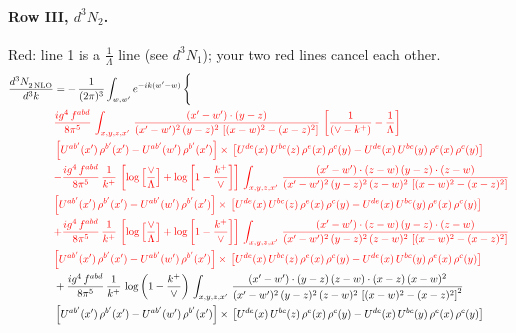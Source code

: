 \documentclass[10pt]{article}
\numberwithin{equation}{section}
\newcommand{\old}[1]{{\color{red}#1}}
\newcommand{\rc}{\color{red}}
\begin{document}
\paragraph{Row III, $d^3N_2$.}
\old{Red}: line 1 is a $\frac{1}{\Lambda}$ line (see $d^3N_1$); your two red lines cancel each other.
\begin{align}
   \frac{d^{3}N_{2\,\rm NLO}^{\rm}}{d^{3}k}  & =  -\,\frac{1}{(2\pi)^{3}}  \int_{w, w^\prime} e^{-ik(w^\prime-w)}\, \Bigg\{\notag \\
& \rc  \frac{ig^{4}\, f^{abd}}{8\pi^{5}}\, \int_{x,y,z,x'}\,\frac{(x'-w')\cdot (y-z)}{(x'-w')^{2}\, (y-z)^{2}\,\left[(x-w)^{2}-(x-z)^{2}\right]}\,\left[\frac{1}{(\vee-k^{+})}-\frac{1}{\Lambda}\right] \notag \\ & \rc  \left[U^{ab'}(x')\,\rho^{b'}(x')-U^{ab'}(w')\, \rho^{b'}(x')\right]\times\,\left[U^{de}(x)\,U^{bc}(z)\, \rho^{e}(x)\,\rho^{c}(y)-U^{de}(x)\,U^{bc}(y)\,\rho^{e}(x)\,\rho^{c}(y)\right] \notag \\
& \rc  {\color{red}-\frac{ig^{4}\, f^{abd}}{8\pi^{5}}\, \frac{1}{k^{+}}\, \left[\log{\left[\frac{\vee}{\Lambda}\right]} + \log{\left[1-\frac{k^{+}}{\vee}\right]}\right]\,\int_{x,y,z,x'}\,\frac{(x'-w')\cdot (z-w)\, (y-z)\cdot (z-w)}{(x'-w')^{2}\, (y-z)^{2}\, (z-w)^{2}\,\left[(x-w)^{2}-(x-z)^{2}\right]}\,} \notag \\ & \rc  {\color{red}\left[U^{ab'}(x')\,\rho^{b'}(x')-U^{ab'}(w')\, \rho^{b'}(x')\right]\times\,\left[U^{de}(x)\,U^{bc}(z)\, \rho^{e}(x)\,\rho^{c}(y)-U^{de}(x)\,U^{bc}(y)\,\rho^{e}(x)\,\rho^{c}(y)\right]} \notag \\
& \rc  {\color{red}+ \frac{ig^{4}\, f^{abd}}{8\pi^{5}}\, \frac{1}{k^{+}}\,\left[\log{\left[\frac{\vee}{\Lambda}\right]} + \log{\left[1-\frac{k^{+}}{\vee}\right]}\right]\,\int_{x,y,z,x'}\,\frac{(x'-w')\cdot (z-w)\, (y-z)\cdot (z-w)}{(x'-w')^{2}\, (y-z)^{2}\, (z-w)^{2}\,\left[(x-w)^{2}-(x-z)^{2}\right]}} \notag \\ & \rc  {\color{red}\left[U^{ab'}(x')\,\rho^{b'}(x')-U^{ab'}(w')\, \rho^{b'}(x')\right]\times\,\left[U^{de}(x)\,U^{bc}(z)\, \rho^{e}(x)\,\rho^{c}(y)-U^{de}(x)\,U^{bc}(y)\,\rho^{e}(x)\,\rho^{c}(y)\right]} \notag \\
&  + \frac{ig^{4}\, f^{abd}}{8\pi^{5}}\, \frac{1}{k^{+}}\,\log{\left(1-\frac{k^{+}}{\vee}\right)}\, \int_{x,y,z,x'}\,\frac{(x'-w')\cdot  (y-z)\, (z-w)\cdot (x-z)\, (x-w)^{2}}{(x'-w')^{2}\, (y-z)^{2}\, (z-w)^{2}\,\left[(x-w)^{2}-(x-z)^{2}\right]^{2}}\, \notag \\ & \left[U^{ab'}(x')\,\rho^{b'}(x')-U^{ab'}(w')\, \rho^{b'}(x')\right]\times\,\left[U^{de}(x)\,U^{bc}(z)\, \rho^{e}(x)\,\rho^{c}(y)-U^{de}(x)\,U^{bc}(y)\,\rho^{e}(x)\,\rho^{c}(y)\right] \notag \\

\end{align}
\end{document}
